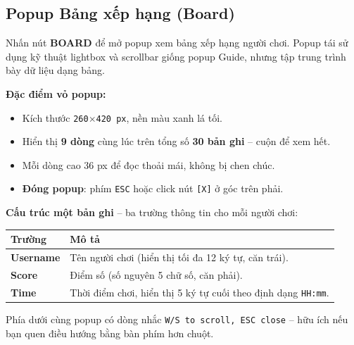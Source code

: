 \documentclass[12pt,a4paper]{article}
\begin{document}
\noindent{}

\subsection{Popup Bảng xếp hạng (Board)}
Nhấn nút \textbf{BOARD} để mở popup xem bảng xếp hạng người chơi. Popup tái sử dụng kỹ thuật lightbox và scrollbar giống popup Guide, nhưng tập trung trình bày dữ liệu dạng bảng.

\vspace{4pt}
\noindent\textbf{Đặc điểm vỏ popup:}
\begin{itemize}
    \item Kích thước \texttt{260$\times$420 px}, nền màu xanh lá tối.
    \item Hiển thị \textbf{9 dòng} cùng lúc trên tổng số \textbf{30 bản ghi} -- cuộn để xem hết.
    \item Mỗi dòng cao 36 px để đọc thoải mái, không bị chen chúc.
    \item \textbf{Đóng popup}: phím \texttt{ESC} hoặc click nút \texttt{[X]} ở góc trên phải.
\end{itemize}

\noindent\textbf{Cấu trúc một bản ghi} -- ba trường thông tin cho mỗi người chơi:

\vspace{4pt}
\begin{tabularx}{\linewidth}{|l|X|}
    \hline
    \textbf{Trường} & \textbf{Mô tả} \\
    \hline
    \textbf{Username} & Tên người chơi (hiển thị tối đa 12 ký tự, căn trái). \\
    \hline
    \textbf{Score}    & Điểm số (số nguyên 5 chữ số, căn phải). \\
    \hline
    \textbf{Time}     & Thời điểm chơi, hiển thị 5 ký tự cuối theo định dạng \texttt{HH:mm}. \\
    \hline
\end{tabularx}

\vspace{4pt}
\noindent Phía dưới cùng popup có dòng nhắc \texttt{W/S to scroll, ESC close} -- hữu ích nếu bạn quen điều hướng bằng bàn phím hơn chuột.
\end{document}
